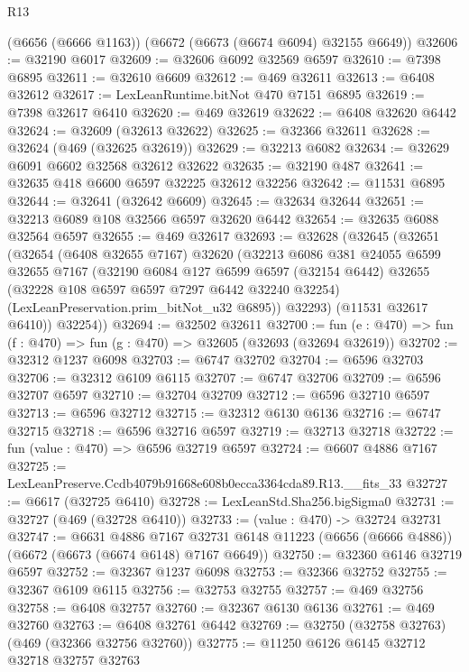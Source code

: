 \begin{lexlean}{R13}
\begin{coremodule}
    (@6656 (@6666 @1163))
    (@6672 (@6673 (@6674 @6094) @32155 @6649))
@32606 := @32190 @6017
@32609 := @32606 @6092 @32569 @6597
@32610 := @7398 @6895
@32611 := @32610 @6609
@32612 := @469 @32611
@32613 := @6408 @32612
@32617 := LexLeanRuntime.bitNot @470 @7151 @6895
@32619 := @7398 @32617 @6410
@32620 := @469 @32619
@32622 := @6408 @32620 @6442
@32624 := @32609 (@32613 @32622)
@32625 := @32366 @32611
@32628 := @32624 (@469 (@32625 @32619))
@32629 := @32213 @6082
@32634 := @32629 @6091 @6602 @32568 @32612 @32622
@32635 := @32190 @487
@32641 := @32635 @418 @6600 @6597 @32225 @32612 @32256
@32642 := @11531 @6895
@32644 := @32641 (@32642 @6609)
@32645 := @32634 @32644
@32651 := @32213 @6089 @108 @32566 @6597 @32620 @6442
@32654 := @32635 @6088 @32564 @6597
@32655 := @469 @32617
@32693 := @32628
    (@32645
      (@32651
        (@32654
          (@6408 @32655 @7167)
          @32620
          (@32213
            @6086
            @381
            @24055
            @6599
            @32655
            @7167
            (@32190
              @6084
              @127
              @6599
              @6597
              (@32154 @6442)
              @32655
              (@32228 @108 @6597 @6597 @7297 @6442 @32240 @32254)
              (LexLeanPreservation.prim_bitNot_u32 @6895))
            @32293)
          (@11531 @32617 @6410))
        @32254))
@32694 := @32502 @32611
@32700 := fun (e : @470) => fun (f : @470) => fun (g : @470) => @32605 (@32693 (@32694 @32619))
@32702 := @32312 @1237 @6098
@32703 := @6747 @32702
@32704 := @6596 @32703
@32706 := @32312 @6109 @6115
@32707 := @6747 @32706
@32709 := @6596 @32707 @6597
@32710 := @32704 @32709
@32712 := @6596 @32710 @6597
@32713 := @6596 @32712
@32715 := @32312 @6130 @6136
@32716 := @6747 @32715
@32718 := @6596 @32716 @6597
@32719 := @32713 @32718
@32722 := fun (value : @470) => @6596 @32719 @6597
@32724 := @6607 @4886 @7167
@32725 := LexLeanPreserve.Ccdb4079b91668e608b0ecca3364cda89.R13.__fits_33
@32727 := @6617 (@32725 @6410)
@32728 := LexLeanStd.Sha256.bigSigma0
@32731 := @32727 (@469 (@32728 @6410))
@32733 := (value : @470) -> @32724 @32731
@32747 := @6631
    @4886
    @7167
    @32731
    @6148
    @11223
    (@6656 (@6666 @4886))
    (@6672 (@6673 (@6674 @6148) @7167 @6649))
@32750 := @32360 @6146 @32719 @6597
@32752 := @32367 @1237 @6098
@32753 := @32366 @32752
@32755 := @32367 @6109 @6115
@32756 := @32753 @32755
@32757 := @469 @32756
@32758 := @6408 @32757
@32760 := @32367 @6130 @6136
@32761 := @469 @32760
@32763 := @6408 @32761 @6442
@32769 := @32750 (@32758 @32763) (@469 (@32366 @32756 @32760))
@32775 := @11250 @6126 @6145 @32712 @32718 @32757 @32763

\end{coremodule}
\end{lexlean}
